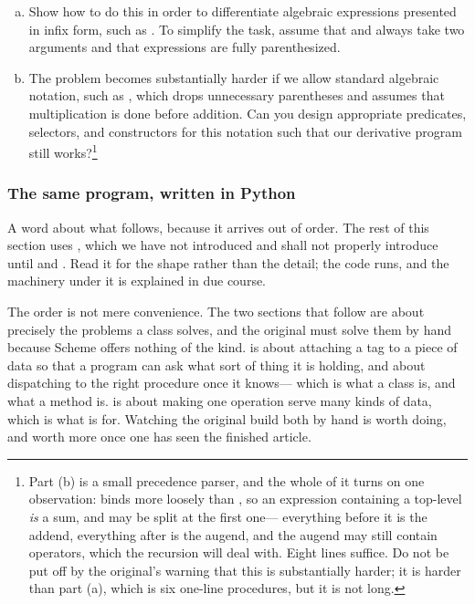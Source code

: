 \begin{exerciseGroup}
\begin{enumerate}[a.]

\item
Show how to do this in order to differentiate algebraic expressions presented
in infix form, such as .  To
simplify the task, assume that  and  always take two
arguments and that expressions are fully parenthesized.

\item
The problem becomes substantially harder if we allow standard algebraic
notation, such as , which drops
unnecessary parentheses and assumes that multiplication is done before
addition.  Can you design appropriate predicates, selectors, and constructors
for this notation such that our derivative program still works?\footnote{Part
(b) is a small precedence parser, and the whole of it turns on one observation:
 binds more loosely than , so an expression containing a
top-level  \emph{is} a sum, and may be split at the first one---
everything before it is the addend, everything after is the augend, and the
augend may still contain operators, which the recursion will deal with.  Eight
lines suffice.  Do not be put off by the original's warning that this is
substantially harder; it is harder than part (a), which is six one-line
procedures, but it is not long.}

\end{enumerate}
\end{exerciseGroup}

\subsubsection*{The same program, written in Python}

A word about what follows, because it arrives out of order.  The rest of this
section uses , which we have not introduced and shall not
properly introduce until  and .  Read it
for the shape rather than the detail; the code runs, and the machinery under it
is explained in due course.

The order is not mere convenience.  The two sections that follow are about
precisely the problems a class solves, and the original must solve them by hand
because Scheme offers nothing of the kind.   is about
attaching a tag to a piece of data so that a program can ask what sort of thing
it is holding, and about dispatching to the right procedure once it knows---%
which is what a class is, and what a method is.   is about
making one operation serve many kinds of data, which is what 
is for.  Watching the original build both by hand is worth doing, and worth
more once one has seen the finished article.

